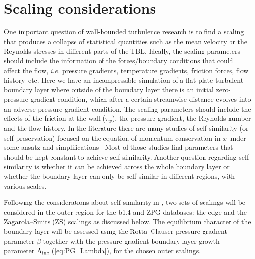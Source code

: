 \section{Scaling considerations} \label{sec:Scalings}

One important question of wall-bounded turbulence research is to find a scaling that produces a collapse of statistical quantities such as the mean velocity or the Reynolds stresses in different parts of the TBL. Ideally, the scaling parameters should include the information of the forces/boundary conditions that could affect the flow, {\it i.e.} pressure gradients, temperature gradients, friction forces, flow history, etc.
Here we have an incompressible simulation of a flat-plate turbulent boundary layer where outside of the boundary layer there is an initial zero-pressure-gradient condition, which after a certain streamwise distance evolves into an adverse-pressure-gradient condition. The scaling parameters should include the effects of the friction at the wall ($\tau_w$), the pressure gradient, the Reynolds number and the flow history.
In the literature there are many studies of self-similarity (or self-preservation) focused on the equation of momentum conservation in $x$ under some ansatz and simplifications \citep{rotta1950theorie, Townsend_1956_structure, Castillo_2004, Kitsios2016, Gibis2019}. Most of those studies find parameters that should be kept constant to achieve self-similarity. Another question regarding self-similarity is whether it can be achieved across the whole boundary layer or whether the boundary layer can only be self-similar in different regions, with various scales.



Following the considerations about self-similarity in \citet{Gibis2019}, two sets of scalings will be considered in the outer region for the b1.4 and ZPG databases: the edge and the Zagarola--Smits (ZS) scalings as discussed below. The equilibrium character of the boundary layer will be assessed using the Rotta--Clauser pressure-gradient parameter $\beta$ together with the pressure-gradient boundary-layer growth parameter $\Lambda_{\rm inc}$ (\ref{eq:PG_Lambda}), for the chosen outer scalings.

